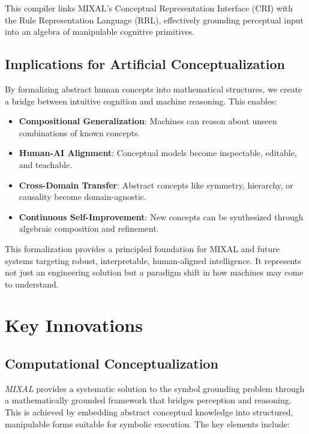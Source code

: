 \documentclass[12pt]{article}
\newcommand{\MIXAL}{\textit{MIXAL}}
\begin{document}
This compiler links MIXAL’s Conceptual Representation Interface (CRI) with the Rule Representation Language (RRL), effectively grounding perceptual input into an algebra of manipulable cognitive primitives.

\subsection{Implications for Artificial Conceptualization}

By formalizing abstract human concepts into mathematical structures, we create a bridge between intuitive cognition and machine reasoning. This enables:

\begin{itemize}
    \item \textbf{Compositional Generalization}: Machines can reason about unseen combinations of known concepts.
    \item \textbf{Human-AI Alignment}: Conceptual models become inspectable, editable, and teachable.
    \item \textbf{Cross-Domain Transfer}: Abstract concepts like symmetry, hierarchy, or causality become domain-agnostic.
    \item \textbf{Continuous Self-Improvement}: New concepts can be synthesized through algebraic composition and refinement.
\end{itemize}

This formalization provides a principled foundation for MIXAL and future systems targeting robust, interpretable, human-aligned intelligence. It represents not just an engineering solution but a paradigm shift in how machines may come to understand.

\section{Key Innovations}

\subsection{Computational Conceptualization}

\MIXAL{} provides a systematic solution to the symbol grounding problem through a mathematically grounded framework that bridges perception and reasoning. This is achieved by embedding abstract conceptual knowledge into structured, manipulable forms suitable for symbolic execution. The key elements include:
\end{document}
